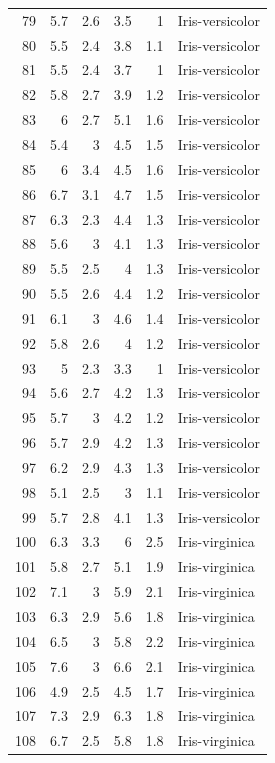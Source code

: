 \documentclass [oneside,10pt,a4paper,ngerman,BCOR10mm,headsepline,parindent,final]{scrartcl}
\begin{document}
\begin{longtable}[]{@{}rrrrrl@{}}
79 & 5.7 & 2.6 & 3.5 & 1 & Iris-versicolor \\
80 & 5.5 & 2.4 & 3.8 & 1.1 & Iris-versicolor \\
81 & 5.5 & 2.4 & 3.7 & 1 & Iris-versicolor \\
82 & 5.8 & 2.7 & 3.9 & 1.2 & Iris-versicolor \\
83 & 6 & 2.7 & 5.1 & 1.6 & Iris-versicolor \\
84 & 5.4 & 3 & 4.5 & 1.5 & Iris-versicolor \\
85 & 6 & 3.4 & 4.5 & 1.6 & Iris-versicolor \\
86 & 6.7 & 3.1 & 4.7 & 1.5 & Iris-versicolor \\
87 & 6.3 & 2.3 & 4.4 & 1.3 & Iris-versicolor \\
88 & 5.6 & 3 & 4.1 & 1.3 & Iris-versicolor \\
89 & 5.5 & 2.5 & 4 & 1.3 & Iris-versicolor \\
90 & 5.5 & 2.6 & 4.4 & 1.2 & Iris-versicolor \\
91 & 6.1 & 3 & 4.6 & 1.4 & Iris-versicolor \\
92 & 5.8 & 2.6 & 4 & 1.2 & Iris-versicolor \\
93 & 5 & 2.3 & 3.3 & 1 & Iris-versicolor \\
94 & 5.6 & 2.7 & 4.2 & 1.3 & Iris-versicolor \\
95 & 5.7 & 3 & 4.2 & 1.2 & Iris-versicolor \\
96 & 5.7 & 2.9 & 4.2 & 1.3 & Iris-versicolor \\
97 & 6.2 & 2.9 & 4.3 & 1.3 & Iris-versicolor \\
98 & 5.1 & 2.5 & 3 & 1.1 & Iris-versicolor \\
99 & 5.7 & 2.8 & 4.1 & 1.3 & Iris-versicolor \\
100 & 6.3 & 3.3 & 6 & 2.5 & Iris-virginica \\
101 & 5.8 & 2.7 & 5.1 & 1.9 & Iris-virginica \\
102 & 7.1 & 3 & 5.9 & 2.1 & Iris-virginica \\
103 & 6.3 & 2.9 & 5.6 & 1.8 & Iris-virginica \\
104 & 6.5 & 3 & 5.8 & 2.2 & Iris-virginica \\
105 & 7.6 & 3 & 6.6 & 2.1 & Iris-virginica \\
106 & 4.9 & 2.5 & 4.5 & 1.7 & Iris-virginica \\
107 & 7.3 & 2.9 & 6.3 & 1.8 & Iris-virginica \\
108 & 6.7 & 2.5 & 5.8 & 1.8 & Iris-virginica \\

\end{longtable}
\end{document}

